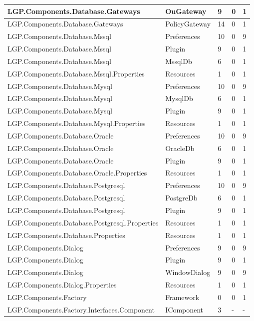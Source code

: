 \begin{table}[h!t]
{\begin{tabular}{ | p{65mm} | p{28mm} | p{12mm} | p{12mm} | p{12mm}  | }
				LGP.Components.Database.Gateways & OuGateway & 9     & 0     & 1  \\ \hline
				LGP.Components.Database.Gateways & PolicyGateway & 14    & 0     & 1  \\ \hline
				LGP.Components.Database.Mssql & Preferences & 10    & 0     & 9  \\ \hline
				LGP.Components.Database.Mssql & Plugin & 9     & 0     & 1  \\ \hline
				LGP.Components.Database.Mssql & MssqlDb & 6     & 0     & 1  \\ \hline
				LGP.Components.Database.Mssql.Properties & Resources & 1     & 0     & 1  \\ \hline
				LGP.Components.Database.Mysql & Preferences & 10    & 0     & 9  \\ \hline
				LGP.Components.Database.Mysql & MysqlDb & 6     & 0     & 1  \\ \hline
				LGP.Components.Database.Mysql & Plugin & 9     & 0     & 1  \\ \hline
				LGP.Components.Database.Mysql.Properties & Resources & 1     & 0     & 1  \\ \hline
				LGP.Components.Database.Oracle & Preferences & 10    & 0     & 9  \\ \hline
				LGP.Components.Database.Oracle & OracleDb & 6     & 0     & 1  \\ \hline
				LGP.Components.Database.Oracle & Plugin & 9     & 0     & 1  \\ \hline
				LGP.Components.Database.Oracle.Properties & Resources & 1     & 0     & 1  \\ \hline
				LGP.Components.Database.Postgresql & Preferences & 10    & 0     & 9  \\ \hline
				LGP.Components.Database.Postgresql & PostgreDb & 6     & 0     & 1  \\ \hline
				LGP.Components.Database.Postgresql & Plugin & 9     & 0     & 1  \\ \hline	
				LGP.Components.Database.Postgresql.Properties & Resources & 1     & 0     & 1  \\ \hline
				LGP.Components.Database.Properties & Resources & 1     & 0     & 1  \\ \hline
				LGP.Components.Dialog & Preferences & 9     & 0     & 9  \\ \hline		
				LGP.Components.Dialog & Plugin & 9     & 0     & 1  \\ \hline
				LGP.Components.Dialog & WindowDialog & 9     & 0     & 9  \\ \hline
				LGP.Components.Dialog.Properties & Resources & 1     & 0     & 1  \\ \hline	
				LGP.Components.Factory & Framework & 0     & 0     & 1  \\ \hline
				LGP.Components.Factory.Interfaces.Component & IComponent & 3     & -     & -  \\ \hline
				\end{tabular}}
				

\end{table}
